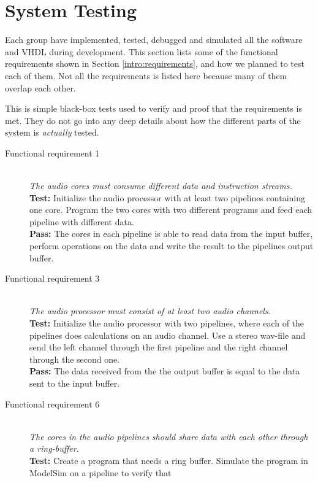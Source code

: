 \section{System Testing}
Each group have implemented, tested, debugged and simulated all the
software and VHDL during development. This section lists some of the
functional requirements shown in Section \ref{intro:requirements},
and how we planned to test each of them. Not all the requirements
is listed here because many of them overlap each other.

This is simple black-box tests used to verify and proof that
the requirements is met. They do not go into any deep details about
how the different parts of the system is \textit{actually} tested.

\begin{description}
    \item[Functional requirement 1] \hfill \\
        \textit{The audio cores must consume different data and instruction streams.} \\
        \textbf{Test:} Initialize the audio processor with at least two pipelines
        containing one core. Program the two cores with two different programs and feed
        each pipeline with different data.\\
        \textbf{Pass:} The cores in each pipeline is able to read data from the input buffer,
        perform operations on the data and write the result to the pipelines output buffer.
    \item[Functional requirement 3] \hfill \\
        \textit{The audio processor must consist of at least two audio channels.} \\
        \textbf{Test:} Initialize the audio processor with two pipelines, where each of the 
        pipelines does calculations on an audio channel. Use a stereo wav-file and send
        the left channel through the first pipeline and the right channel through the
        second one. \\
        \textbf{Pass:} The data received from the the output buffer is equal to the
        data sent to the input buffer. 
    \item[Functional requirement 6] \hfill \\
        \textit{The cores in the audio pipelines should share data with each other through a ring-buffer.} \\
        \textbf{Test:} Create a program that needs a ring buffer. 
        Simulate the program in ModelSim on a pipeline to verify that

\end{description}

